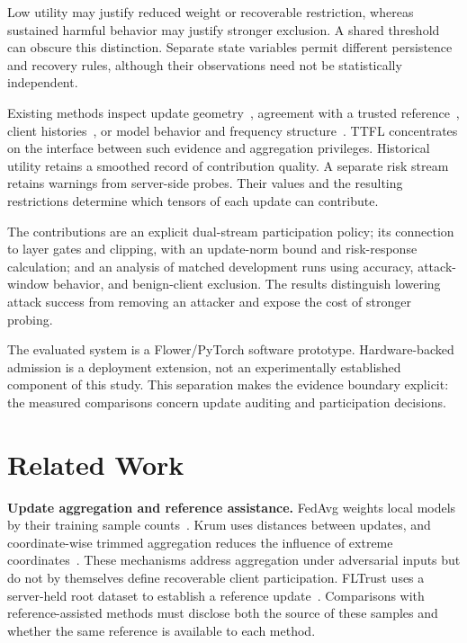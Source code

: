 \documentclass[conference,compsoc]{IEEEtran}
\begin{document}
Low utility may justify reduced weight or recoverable restriction, whereas sustained harmful behavior may justify stronger exclusion. A shared threshold can obscure this distinction. Separate state variables permit different persistence and recovery rules, although their observations need not be statistically independent.

Existing methods inspect update geometry~\cite{blanchard2017krum,yin2018byzantine}, agreement with a trusted reference~\cite{cao2021fltrust}, client histories~\cite{fung2020foolsgold,fldetector2022}, or model behavior and frequency structure~\cite{deepsight2022,flame2022,freqfed2024}. TTFL concentrates on the interface between such evidence and aggregation privileges. Historical utility retains a smoothed record of contribution quality. A separate risk stream retains warnings from server-side probes. Their values and the resulting restrictions determine which tensors of each update can contribute.

The contributions are an explicit dual-stream participation policy; its connection to layer gates and clipping, with an update-norm bound and risk-response calculation; and an analysis of matched development runs using accuracy, attack-window behavior, and benign-client exclusion. The results distinguish lowering attack success from removing an attacker and expose the cost of stronger probing.

The evaluated system is a Flower/PyTorch software prototype. Hardware-backed admission is a deployment extension, not an experimentally established component of this study. This separation makes the evidence boundary explicit: the measured comparisons concern update auditing and participation decisions.

\section{Related Work}
\textbf{Update aggregation and reference assistance.}
FedAvg weights local models by their training sample counts~\cite{mcmahan2017fedavg}. Krum uses distances between updates, and coordinate-wise trimmed aggregation reduces the influence of extreme coordinates~\cite{blanchard2017krum,yin2018byzantine}. These mechanisms address aggregation under adversarial inputs but do not by themselves define recoverable client participation. FLTrust uses a server-held root dataset to establish a reference update~\cite{cao2021fltrust}. Comparisons with reference-assisted methods must disclose both the source of these samples and whether the same reference is available to each method.
\end{document}
